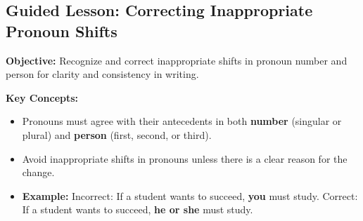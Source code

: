 \documentclass[12pt]{article}
\title{}
\date{}
\begin{document}
\subsection*{Guided Lesson: Correcting Inappropriate Pronoun Shifts}
\onehalfspacing

\begin{tcolorbox}[colframe=black!40, colback=gray!5, 
coltitle=black, colbacktitle=black!20, fonttitle=\bfseries\Large, 
title=Learning Objective, halign title=center, left=5pt, right=5pt, top=5pt, bottom=15pt]
\textbf{Objective:} Recognize and correct inappropriate shifts in pronoun number and person for clarity and consistency in writing.
\end{tcolorbox}

\vspace{1em}

\begin{tcolorbox}[colframe=black!60, colback=white, 
coltitle=black, colbacktitle=black!15, fonttitle=\bfseries\Large, 
title=Key Concepts and Vocabulary, halign title=center, left=10pt, right=10pt, top=10pt, bottom=15pt]
\textbf{Key Concepts:}
\begin{itemize}
    \item Pronouns must agree with their antecedents in both \textbf{number} (singular or plural) and \textbf{person} (first, second, or third).
    \item Avoid inappropriate shifts in pronouns unless there is a clear reason for the change.
    \item \textbf{Example:}  
    Incorrect: If a student wants to succeed, \textbf{you} must study.  
    Correct: If a student wants to succeed, \textbf{he or she} must study.  
\end{itemize}
\end{tcolorbox}

\vspace{1em}
\end{document}
